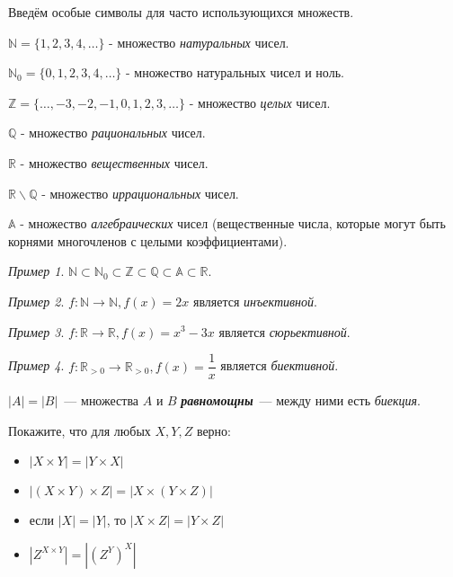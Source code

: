 \documentclass{article}
\newcommand{\N}{\mathbb{N}}
\newcommand{\R}{\mathbb{R}}
\newcommand{\A}{\mathbb{A}}
\newcommand{\Q}{\mathbb{Q}}
\newcommand{\Z}{\mathbb{Z}}
\theoremstyle{remark}
\newtheorem{example}{Пример}
\begin{document}
\begin{definition}
	Введём особые символы для часто использующихся множеств. 
	
	$\mathbb{N} = \{1,2,3,4,\dotsc \}$ - множество \textit{натуральных} чисел.
	
	$\mathbb{N}_0 = \{0,1,2,3,4,\dotsc \}$ - множество натуральных чисел и ноль.
	
	$\mathbb{Z} = \{\dotsc, -3, -2, -1, 0,1,2,3,\dotsc \}$ - множество \textit{целых} чисел.
	
	$\mathbb{Q}$ - множество \textit{рациональных} чисел.
	
	$\mathbb{R}$ - множество \textit{вещественных} чисел.
	
	$\mathbb{R\backslash Q}$ - множество \textit{иррациональных} чисел.
	
	$\mathbb{A}$ - множество \textit{алгебраических} чисел (вещественные числа, которые могут быть корнями многочленов с целыми коэффициентами).
\end{definition}

\begin{example}
	$\N \subset \N_0 \subset \Z \subset \Q \subset \A \subset \R.$
\end{example}

\begin{example}
	$f: \N \rightarrow \N, f(x) = 2x$ является \textit{инъективной}.
\end{example}
\begin{example}
	$f: \R \rightarrow \R, f(x) = x^3 - 3x$ является \textit{сюрьективной}.
\end{example}
\begin{example}
	$f: \R_{>0} \rightarrow \R_{>0}, f(x) = \dfrac{1}{x}$ является \textit{биективной}.
\end{example}

\begin{definition}
	$|A| = |B|$~--- множества $A$ и $B$ \textit{\textbf{равномощны}}~--- между ними есть \textit{биекция}.
\end{definition}

\begin{task} 
	Покажите, что для любых $X, Y, Z$ верно: \\
	\newline
	\begin{minipage}[c]{0.5\textwidth}
		\begin{itemize}
			\item $|X\times Y|=|Y \times X|$
			\item $|(X\times Y)\times Z|=|X\times (Y \times Z)|$
		\end{itemize}
	\end{minipage}
	\begin{minipage}[c]{0.5\textwidth}
		\begin{itemize}
			\item если $|X|=|Y|$, то $|X\times Z|=|Y \times Z|$
			\item $|Z^{X\times Y}|=|(Z^Y)^X|$
		\end{itemize}
	\end{minipage}
\end{task}
\end{document}
